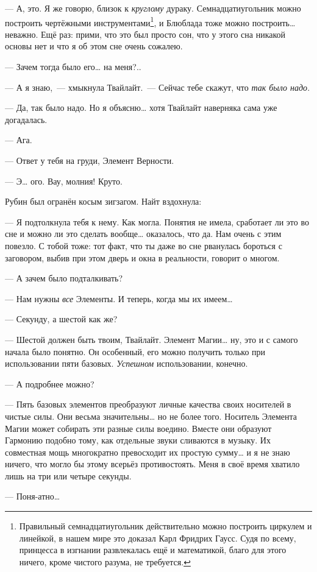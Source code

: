 \documentclass[twoside,a5paper,12pt]{extbook}
\begin{document}
— А, это. Я же говорю, близок к \textit{круглому} дураку. Семнадцатиугольник можно построить чертёжными инструментами\footnote{Правильный семнадцатиугольник действительно можно построить циркулем и линейкой, в нашем мире это доказал Карл
Фридрих Гаусс. Судя по всему, принцесса в изгнании развлекалась ещё и математикой, благо для этого ничего, кроме чистого
разума, не требуется.}, и Блюблада тоже можно построить… неважно. Ещё раз: прими, что это был просто сон, что у этого сна никакой основы нет и что я об этом сне очень сожалею.

— Зачем тогда было его… на меня?..

— А я знаю, — хмыкнула Твайлайт. — Сейчас тебе скажут, что \textit{так было надо}.

— Да, так было надо. Но я объясню… хотя Твайлайт наверняка сама уже догадалась.

— Ага.

— Ответ у тебя на груди, Элемент Верности.

— Э… ого. Вау, молния! Круто.

Рубин был огранён косым зигзагом. Найт вздохнула:

— Я подтолкнула тебя к нему. Как могла. Понятия не имела, сработает ли это во сне и можно ли это сделать вообще… оказалось, что да. Нам очень с этим повезло. С тобой тоже: тот факт, что ты даже во сне рванулась бороться с заговором, выбив при этом дверь и окна в реальности, говорит о многом.

— А зачем было подталкивать?

— Нам нужны \textit{все} Элементы. И теперь, когда мы их имеем…

— Секунду, а шестой как же?

— Шестой должен быть твоим, Твайлайт. Элемент Магии… ну, это и с самого начала было понятно. Он особенный, его можно получить только при использовании пяти базовых. \textit{Успешном} использовании, конечно.

— А подробнее можно?

— Пять базовых элементов преобразуют личные качества своих носителей в чистые силы. Они весьма значительны… но не более того. Носитель Элемента Магии может собирать эти разные силы воедино. Вместе они образуют Гармонию подобно тому, как отдельные звуки сливаются в музыку. Их совместная мощь многократно превосходит их простую сумму… и я не знаю ничего, что могло бы этому всерьёз противостоять. Меня в своё время хватило лишь на три или четыре секунды.

— Поня-атно…
\end{document}

